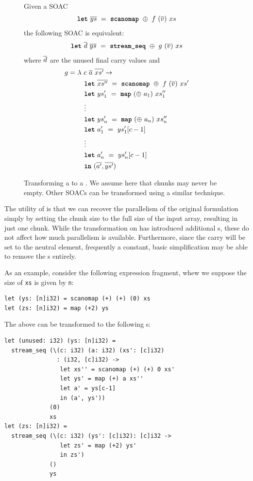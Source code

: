 \begin{figure}
Given a SOAC
\[
  \mbox{\texttt{\bfseries{let}}}~\overline{ys}~=~\mbox{\texttt{\bfseries{scanomap}}}~\oplus~f~(\overline{v})~xs
\]
the following SOAC is equivalent:
\[
  \mbox{\texttt{\bfseries{let}}}~\overline{d}~\overline{ys}~=~\mbox{\texttt{\bfseries{stream\_seq}}}{}~\oplus~g~(\overline{v})~xs
\]
where $\overline{d}$ are the unused final carry values and
  \begin{align*}
    g =~& \lambda~c~\overline{a}~\overline{xs'} \rightarrow \\
        & \quad \mbox{\texttt{\bfseries{let}}}~\overline{xs''}~=~\mbox{\texttt{\bfseries{scanomap}}}~\oplus~f~(\overline{v})~xs' \\
        & \quad \mbox{\texttt{\bfseries{let}}}~ys'_{1}~=~\mbox{\texttt{\bfseries{map}}}~(\oplus~a_{1})~xs''_{1} \\
        & \quad \vdots \\
        & \quad \mbox{\texttt{\bfseries{let}}}~ys'_{n}~=~\mbox{\texttt{\bfseries{map}}}~(\oplus~a_{n})~xs''_{n} \\
        & \quad \mbox{\texttt{\bfseries{let}}}~a'_{1}~=~ys'_{1}[c-1] \\
        & \quad \vdots \\
        & \quad \mbox{\texttt{\bfseries{let}}}~a'_{n}~=~ys'_{n}[c-1] \\
        & \quad \mbox{\texttt{\bfseries{in}}}~(\overline{a'},\overline{ys'})
  \end{align*}
  \caption{Transforming a  to a \StreamSeq{}.  We assume
    here that chunks may never be empty.  Other SOACs can be
    transformed using a similar technique.}
  \label{fig:scanomap-to-streamseq}
\end{figure}

The utility of \StreamSeq{} is that we can recover the parallelism of
the original formulation simply by setting the chunk size to the full
size of the input array, resulting in just one chunk.  While the
transformation on  has introduced
additional s, these do not affect how much parallelism is
available.  Furthermore, since the carry will be set to the neutral
element, frequently a constant, basic simplification may be able to
remove the s entirely.

As an example, consider the following expression fragment, whew we
suppose the size of \lstinline{xs} is given by \lstinline{n}:

\begin{lstlisting}
let (ys: [n]i32) = scanomap (+) (+) (0) xs
let (zs: [n]i32) = map (+2) ys
\end{lstlisting}

The above can be transformed to the following \StreamSeq{}s:

\begin{lstlisting}
let (unused: i32) (ys: [n]i32) =
  stream_seq (\(c: i32) (a: i32) (xs': [c]i32)
               : (i32, [c]i32) ->
                let xs'' = scanomap (+) (+) 0 xs'
                let ys' = map (+) a xs''
                let a' = ys[c-1]
                in (a', ys'))
             (0)
             xs
let (zs: [n]i32) =
  stream_seq (\(c: i32) (ys': [c]i32): [c]i32 ->
                let zs' = map (+2) ys'
                in zs')
             ()
             ys
\end{lstlisting}

